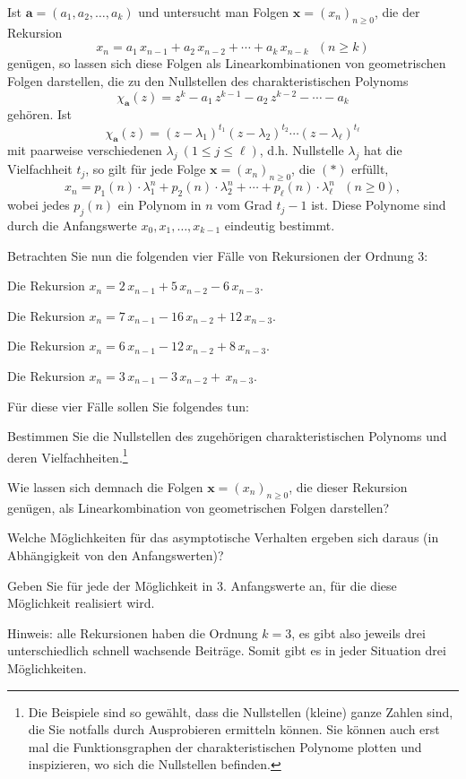 Ist $\boldsymbol{a}=(a_1,a_2, \ldots, a_k)$ und untersucht man Folgen
$\boldsymbol{x}= (x_n)_{n \geq 0}$, die der  Rekursion
\begin{equation*}
x_n = a_1 \, x_{n-1} + a_2  \, x_{n-2} + \cdots + a_k  \, x_{n-k}~~~(n \geq k) \tag{$*$}
\end{equation*}
genügen, so lassen sich diese Folgen als Linearkombinationen von geometrischen
Folgen darstellen, die zu den Nullstellen des charakteristischen Polynoms
\[
\chi_{\boldsymbol{a}}(z) = z^k -a_1  \, z^{k-1} - a_2  \, z^{k-2} - \cdots - a_k
\]
gehören. Ist
\[
\chi_{\boldsymbol{a}}(z)  = (z-\lambda_1)^{t_1}(z-\lambda_2)^{t_2} \cdots (z-\lambda_\ell)^{t_\ell}
\]
mit paarweise verschiedenen $\lambda_j~(1 \leq j \leq \ell)$, d.h. Nullstelle $\lambda_j$ hat die
Vielfachheit $t_j$, so gilt für jede Folge $\boldsymbol{x}= (x_n)_{n \geq 0}$, die $(*)$ erfüllt,
\[
x_n = p_1(n)\cdot \lambda_1^n + p_2(n)\cdot \lambda_2^{n} + \cdots + p_\ell(n) \cdot \lambda_\ell^{n}~~~(n \geq 0),
\]
wobei jedes $p_j(n)$ ein Polynom in $n$ vom Grad $t_j-1$ ist. Diese Polynome sind  durch die 
Anfangswerte $x_0,x_1, \ldots ,x_{k-1}$ eindeutig bestimmt.

Betrachten Sie nun die folgenden vier Fälle von Rekursionen der Ordnung 3:
\begin{flushalpha}
\item Die Rekursion $x_n = 2 \, x_{n-1} + 5 \, x_{n-2} - 6 \, x_{n-3}$.
\item Die Rekursion $x_n = 7 \, x_{n-1} - 16 \, x_{n-2} +12 \, x_{n-3}$.
\item Die Rekursion $x_n = 6 \, x_{n-1} - 12 \, x_{n-2} +8 \, x_{n-3}$.
\item Die Rekursion $x_n = 3 \, x_{n-1} - 3 \, x_{n-2} + \, x_{n-3}$.
\end{flushalpha}

Für diese vier Fälle sollen Sie folgendes tun:
\begin{flushenum}
\item Bestimmen Sie die Nullstellen des zugehörigen charakteristischen Polynoms und
	deren Vielfachheiten.\footnote{
	Die Beispiele sind so gewählt, dass die Nullstellen (kleine) ganze Zahlen sind, die
	Sie notfalls durch Ausprobieren ermitteln können. Sie können auch erst mal die
	Funktionsgraphen der charakteristischen Polynome plotten und inspizieren, wo sich
	die Nullstellen befinden.}
\item Wie lassen sich demnach die Folgen $\boldsymbol{x}= (x_n)_{n \geq 0}$, 
	die dieser Rekursion genügen, als
	Linearkombination von geometrischen Folgen darstellen?
\item Welche Möglichkeiten für das asymptotische Verhalten ergeben sich daraus
	(in Abhängigkeit von den Anfangswerten)?
\item Geben Sie für jede der Möglichkeit in 3. Anfangswerte an, für die diese
	Möglichkeit realisiert wird.
\end{flushenum}
Hinweis: alle Rekursionen haben die Ordnung $k=3$, es gibt also jeweils drei
	unterschiedlich schnell wachsende Beiträge. Somit gibt es in jeder Situation
	drei Möglichkeiten.


